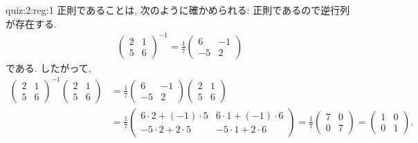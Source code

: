 \begin{checkanswer}{quiz:2:reg:1}
  正則であることは, 次のように確かめられる:
  正則であるので逆行列が存在する.
  \begin{align*}
     \begin{pmatrix}
      2&1\\5&6
     \end{pmatrix}^{-1}=
     \frac{1}{7}
     \begin{pmatrix}
      6&-1\\-5&2
    \end{pmatrix}
  \end{align*}
  である.
  したがって,
  \begin{align*}
     \begin{pmatrix}
      2&1\\5&6
     \end{pmatrix}^{-1}
     \begin{pmatrix}
      2&1\\5&6
    \end{pmatrix}
    & =
     \frac{1}{7}
     \begin{pmatrix}
      6&-1\\-5&2
    \end{pmatrix}
    \begin{pmatrix}
      2&1\\5&6
    \end{pmatrix}\\
   & =
    \frac{1}{7}
     \begin{pmatrix}
       6\cdot 2+(-1)\cdot 5&6\cdot 1+(-1)\cdot 6\\
       -5\cdot 2+2\cdot 5&-5\cdot 1+2\cdot 6
    \end{pmatrix}
    =
    \frac{1}{7}
     \begin{pmatrix}
       7&0\\
       0&7
    \end{pmatrix}
    =
     \begin{pmatrix}
       1&0\\
       0&1
    \end{pmatrix}.
  \end{align*}
\end{checkanswer}


